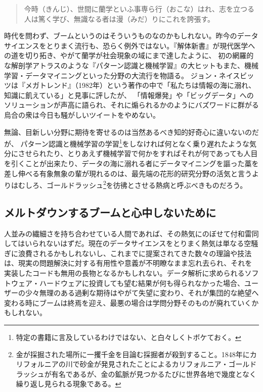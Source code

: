 \begin{quote}
今時（きんじ）、世間に蘭学といふ事専ら行（おこな）はれ、志を立つる人は篤く学び、無識なる者は漫（みだ）りにこれを誇張す。
\end{quote}

時代を問わず、ブームというのはそういうものなのかもしれない。昨今のデータサイエンスをとりまく流行も、恐らく例外ではない。『解体新書』が現代医学への道を切り拓き、やがて蘭学が社会現象の域にまで達したように、
初の網羅的な解剖学アトラスのような『パターン認識と機械学習』の大ヒットもまた、機械学習・データマイニングといった分野の大流行を物語る。
ジョン・ネイスビッツは『メガトレンド』（1982年）という著作の中で「私たちは情報の海に溺れ、知識に飢えている」と見事に評したが、
「情報爆発」や「ビッグデータ」へのソリューションが声高に語られ、それに煽られるかのようにバズワードに群がる烏合の衆は今日も騒がしいツイートをやめない。

無論、目新しい分野に期待を寄せるのは当然あるべき知的好奇心に違いないのだが、
パターン認識と機械学習の学習\footnote{特定の書籍に言及しているわけではない、と白々しくトボケておく。}をしなければ何となく乗り遅れたような気分にさせられたり、とりあえず機械学習で何かをすればそれが何であっても人目を引くことが出来たり、データの海に溺れる者にデータマイニングを謳った藁を差し伸べる有象無象の輩が現れるのは、最先端の花形的研究分野の活気と言うよりはむしろ、ゴールドラッシュ\footnote{金が採掘された場所に一攫千金を目論む採掘者が殺到すること。1848年にカリフォルニアの川で砂金が発見されたことによるカリフォルニア・ゴールドラッシュが有名であるが、金の鉱脈が見つかるたびに世界各地で幾度となく繰り返し見られる現象である。}を彷彿とさせる熱病と呼ぶべきものだろう。

\subsection{メルトダウンするブームと心中しないために}
人並みの繊細さを持ち合わせている人間であれば、その熱気にのぼせて付和雷同してはいられないはずだ。現在のデータサイエンスをとりまく熱気は単なる空騒ぎに浪費されるかもしれないし、これまでに提案されてきた数々の理論や技法は、現実の問題解決に対する有用性や意義が不明瞭なまま忘れ去られ、それを実装したコードも無用の長物となるかもしれない。データ解析に求められるソフトウェア・ハードウェアに投資しても望む結果が何も得られなかった場合、ユーザーの少々無理のある過剰な期待はやがて失望に変わり、それが集団的な絶望へ変わる時にブームは終焉を迎え、最悪の場合は学問分野そのものが廃れていくかもしれない。

